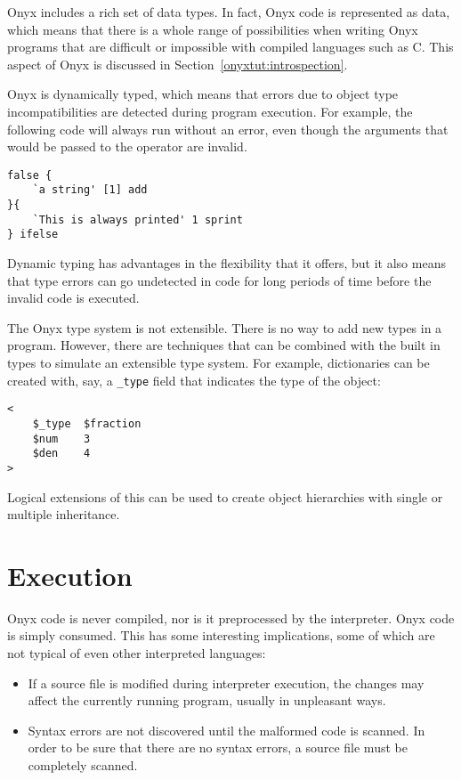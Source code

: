Onyx includes a rich set of data types.  In fact, Onyx code is represented as
data, which means that there is a whole range of possibilities when writing Onyx
programs that are difficult or impossible with compiled languages such as C.
This aspect of Onyx is discussed in Section~\ref{onyxtut:introspection}.

Onyx is dynamically typed, which means that errors due to object type
incompatibilities are detected during program execution.  For example, the
following code will always run without an error, even though the arguments that
would be passed to the  operator are
invalid.

\begin{verbatim}
false {
    `a string' [1] add
}{
    `This is always printed' 1 sprint
} ifelse
\end{verbatim}

Dynamic typing has advantages in the flexibility that it offers, but it also
means that type errors can go undetected in code for long periods of time before
the invalid code is executed.

The Onyx type system is not extensible.  There is no way to add new types in a
program.  However, there are techniques that can be combined with the built in
types to simulate an extensible type system.  For example, dictionaries can be
created with, say, a {\tt \_type} field that indicates the type of the object:

\begin{verbatim}
<
    $_type  $fraction
    $num    3
    $den    4
>
\end{verbatim}

Logical extensions of this can be used to create object hierarchies with single
or multiple inheritance.

\section{Execution}

Onyx code is never compiled, nor is it preprocessed by the interpreter.  Onyx
code is simply consumed.  This has some interesting implications, some of which
are not typical of even other interpreted languages:

\begin{itemize}
\item{If a source file is modified during interpreter execution, the changes may
affect the currently running program, usually in unpleasant ways.}
\item{Syntax errors are not discovered until the malformed code is scanned.  In
order to be sure that there are no syntax errors, a source file must be
completely scanned.}
\end{itemize}

